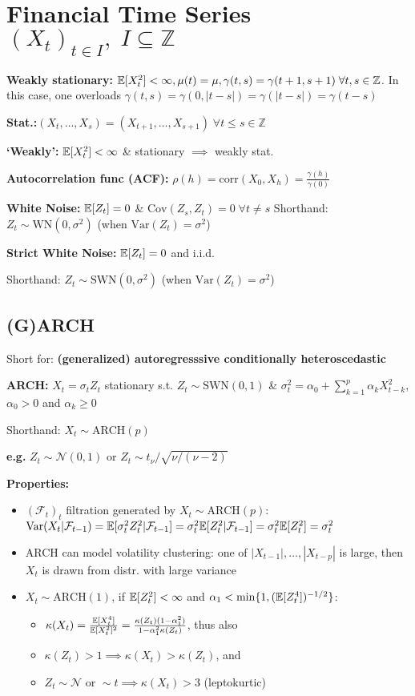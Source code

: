 \section*{Financial Time Series $(X_t)_{t\in I}, \; I\subseteq \mathbb{Z}$}

\textbf{Weakly stationary:} $\mathbb{E}[X^2_t]<\infty, \mu(t)=\mu, \gamma(t,s)=\gamma(t+1,s+1) \; \forall t, s\in \mathbb{Z}$. In this case, one overloads $\gamma(t,s)=\gamma(0,|t-s|)=\gamma(|t-s|)=\gamma(t-s)$

\textbf{Stat.:}$(X_t,\dots,X_s)=(X_{t+1},\dots,X_{s+1})\; \forall t\leq s\in\mathbb{Z}$


\textbf{`Weakly':} $\mathbb{E}[X_t^2]<\infty$ \& stationary $\implies$ weakly stat.

\textbf{Autocorrelation func (ACF):} $\rho(h)=\text{corr}(X_0,X_h)=\frac{\gamma(h)}{\gamma(0)}$

\textbf{White Noise:} $\mathbb{E}[Z_t]=0$ \& $\text{Cov}(Z_s, Z_t)=0\; \forall t\neq s$
Shorthand: $Z_t\sim \text{WN}(0,\sigma^2)$ (when $\text{Var}(Z_t)=\sigma^2$)

\textbf{Strict White Noise:} $\mathbb{E}[Z_t]=0$ and i.i.d.

Shorthand: $Z_t\sim \text{SWN}(0,\sigma^2)$ (when $\text{Var}(Z_t)=\sigma^2$)

\subsection*{(G)ARCH}
Short for: \textbf{(generalized) autoregresssive conditionally heteroscedastic}

\textbf{ARCH:} $X_t=\sigma_t Z_t$ stationary s.t. $Z_t\sim\text{SWN}(0,1)$ \& $\sigma_t^2=\alpha_0 + \sum^p_{k=1}\alpha_k X^2_{t-k}$, $\alpha_0>0$ and $\alpha_k\geq 0$

Shorthand: $X_t\sim \text{ARCH}(p)$

\textbf{e.g.} $Z_t\sim \mathcal{N}(0,1)$ or $Z_t\sim t_{\nu}/\sqrt{\nu/(\nu-2)}$

\textbf{Properties:}
\begin{itemize}
\item $(\mathcal{F}_t)_t$ filtration generated by $X_t\sim \text{ARCH}(p)$: $\text{Var}(X_t|\mathcal{F}_{t-1})=\mathbb{E}[\sigma_t^2 Z_t^2|\mathcal{F}_{t-1}]=\sigma_t^2\mathbb{E}[ Z_t^2|\mathcal{F}_{t-1}]=\sigma_t^2\mathbb{E}[Z_t^2]=\sigma_t^2$
\item ARCH can model volatility clustering: one of $|X_{t-1}|,\dots,|X_{t-p}|$ is large, then $X_t$ is drawn from distr. with large variance
\item $X_t\sim\text{ARCH}(1)$, if $\mathbb{E}[Z_t^2]<\infty$ and $\alpha_1<\min\{1,(\mathbb{E}[Z_t^4])^{-1/2}\}$:
\begin{itemize}
    \item $\kappa(X_t)=\frac{\mathbb{E}[X_t^4]}{\mathbb{E}[X_t^2]^2}=\frac{\kappa(Z_t)(1-\alpha_1^2)}{1-\alpha_1^2\kappa(Z_t)}$, thus also
    \item $\kappa(Z_t)>1 \implies \kappa(X_t)>\kappa(Z_t)$, and
    \item $Z_t\sim\mathcal{N}\text{ or } \sim t \implies \kappa(X_t)>3$ (leptokurtic)   
\end{itemize}
\end{itemize}

